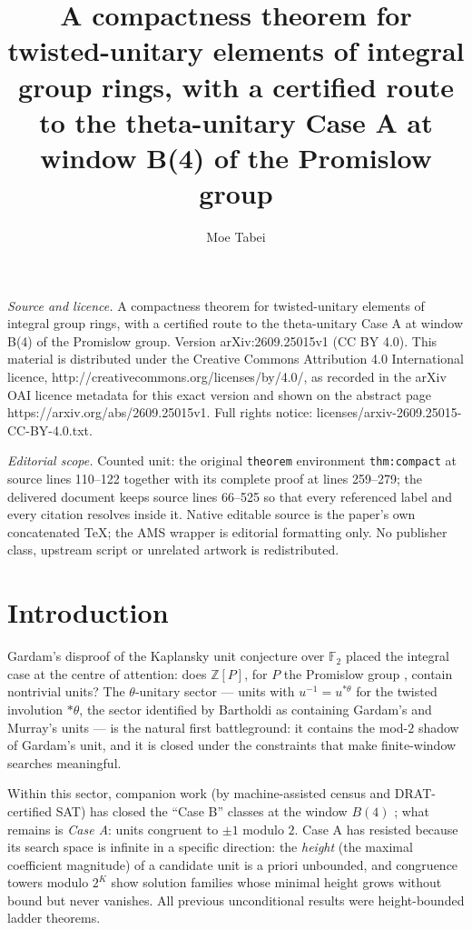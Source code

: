 \documentclass[10pt,a4paper]{amsart}
\newcommand{\ZZ}{\mathbb{Z}}
\newcommand{\thst}{{*\theta}}
\begin{document}
\title[A compactness theorem for twisted-unitary elements of integr]{A compactness theorem for twisted-unitary elements of integral group rings, with a certified route to the theta-unitary Case A at window B(4) of the Promislow group}
\author{Moe Tabei}
\date{}
\maketitle
\noindent\emph{Source and licence.} A compactness theorem for twisted-unitary elements of integral group rings, with a certified route to the theta-unitary Case A at window B(4) of the Promislow group. Version arXiv:2609.25015v1 (CC BY 4.0). This material is distributed under the Creative Commons Attribution 4.0 International licence, http://creativecommons.org/licenses/by/4.0/, as recorded in the arXiv OAI licence metadata for this exact version and shown on the abstract page https://arxiv.org/abs/2609.25015v1. Full rights notice: licenses/arxiv-2609.25015-CC-BY-4.0.txt.\par\smallskip
\noindent\textit{Editorial scope.} Counted unit: the original \texttt{theorem} environment \texttt{thm:compact} at source lines 110--122 together with its complete proof at lines 259--279; the delivered document keeps source lines 66--525 so that every referenced label and every citation resolves inside it. Native editable source is the paper's own concatenated TeX; the AMS wrapper is editorial formatting only. No publisher class, upstream script or unrelated artwork is redistributed.
\section{Introduction}

Gardam's disproof of the Kaplansky unit conjecture over $\mathbb{F}_2$
\cite{Gardam} placed the integral case at the centre of attention:
does $\ZZ[P]$, for $P$ the Promislow group \cite{Promislow1988},
contain nontrivial units?  The $\theta$-unitary sector --- units with
$u^{-1}=u^{\thst}$ for the twisted involution $\thst$, the sector
identified by Bartholdi \cite{Bartholdi2022} as containing Gardam's
and Murray's units --- is the natural first battleground: it contains
the mod-$2$ shadow of Gardam's unit, and it is closed under the
constraints that make finite-window searches meaningful.

Within this sector, companion work (by machine-assisted census and
DRAT-certified SAT) has closed the ``Case B'' classes at the window
$B(4)$ \cite{paper4,paper6}; what remains is \emph{Case A}: units
congruent to $\pm 1$ modulo $2$.  Case A has resisted because its search space is infinite
in a specific direction: the \emph{height} (the maximal coefficient
magnitude) of a candidate unit is a priori unbounded, and congruence
towers modulo $2^K$ show solution families whose minimal height grows
without bound but never vanishes.  All previous unconditional results
were height-bounded ladder theorems.
\end{document}
